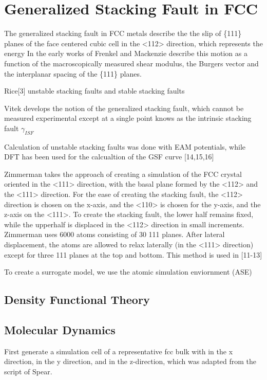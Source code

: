 \section{Generalized Stacking Fault in FCC}
The generalized stacking fault in FCC metals describe the the slip of \{111\} planes of the face centered cubic cell in the <112> direction, which represents the energy
In the early works of Frenkel and Mackenzie describe this motion as a function of the macroscopically measured shear modulus, the Burgers vector and the interplanar spacing of the \{111\} planes.

Rice[3] unstable stacking faults and stable stacking faults

Vitek\cite{vitek1966_gsf,vitek1968_gsf} develops the notion of the generalized stacking fault, which cannot be measured experimental except at a single point knows as the intrinsic stacking fault $\gamma_{ISF}$

Calculation of unstable stacking faults\cite{sun1990_eam_esf,sun1993_eam_esf,farkas1997_eam_usf} was done with EAM potentials, while DFT has been used for the calcualtion of the GSF curve [14,15,16]

Zimmerman takes the approach of creating a simulation of the FCC crystal oriented in the <111> direction, with the basal plane formed by the <112> and the <111> direction.  For the ease of creating the stacking fault, the <112> direction is chosen on the x-axis, and the <110> is chosen for the y-axis, and the z-axis on the <111>.  To create the stacking fault, the lower half remains fixed, while the upperhalf is displaced in the <112> direction in small increments.  Zimmerman uses 6000 atoms consisting of 30 {111} planes.  After lateral displacement, the atoms are allowed to relax laterally (in the <111> direction) except for three {111} planes at the top and bottom.  This method is used in [11-13]

To create a surrogate model, we use the atomic simulation enviornment (ASE)

\subsection{Density Functional Theory}



\subsection{Molecular Dynamics}

First generate a simulation cell of a representative fcc bulk with \hkl[1 1 2] in the x direction, \hkl[-1 1 0] in the y direction, and \hkl[-1 -1 1] in the z-direction, which was adapted from the script of Spear\cite{spear2012_lammps_gsf}.
